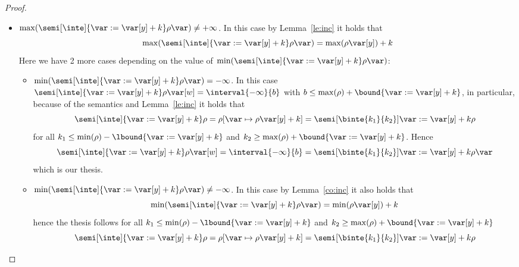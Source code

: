 \begin{proof}
\begin{itemize}
\begin{itemize}
    \end{itemize}
  \item
    \({\max(\semi[\inte]{\var := \var[y] + k}\rho\var)} \neq
    +\infty\). In this case by Lemma~\ref{le:inc} it holds that
    \begin{equation*}
      \max(\semi[\inte]{\var:= \var[y] + k}\rho\var) = \max(\rho\var[y]) + k
    \end{equation*}
    Here we have 2 more cases depending on the value of
    \(\min(\semi[\inte]{\var:= \var[y] + k}\rho\var)\):
    \begin{itemize}
    \item
      \({\min(\semi[\inte]{\var:= \var[y] + k}\rho\var)} =
      -\infty\). In this case
      \(\semi[\inte]{\var := \var[y] + k}\rho\var[w] =
      \interval{-\infty}{b}\) with
      \(b \leq \max(\rho) + \bound{\var := \var[y] + k}\), in
      particular, because of the semantics and Lemma~\ref{le:inc} it
      holds that
      \begin{equation*}
        \semi[\inte]{\var := \var[y] + k}\rho = \rho[\var \mapsto \rho\var[y] + k] = \semi[\binte{k_1}{k_2}]{\var := \var[y] + k}\rho
      \end{equation*}
      for all \(k_1 \leq \min(\rho) - \lbound{\var := \var[y] + k}\)
      and \(k_2 \geq \max(\rho) + \bound{\var := \var[y] + k}\). Hence
      \begin{equation*}
        \semi[\inte]{\var := \var[y] + k}\rho\var[w] = \interval{-\infty}{b} = \semi[\binte{k_1}{k_2}]{\var:=\var[y]+k}\rho\var
      \end{equation*}
      which is our thesis.
      
    \item
      \({\min(\semi[\inte]{\var:= \var[y] + k}\rho\var)} \neq
      -\infty\). In this case by Lemma~\ref{co:inc} it also holds that
      \begin{equation*}
        \min(\semi[\inte]{\var := \var[y] + k}\rho\var) = \min(\rho\var[y]) + k
      \end{equation*}
      hence the thesis follows for all
      \(k_1 \leq \min(\rho) - \lbound{\var := \var[y] + k}\) and
      \(k_2 \geq \max(\rho) + \bound{\var := \var[y] + k}\)
      \begin{equation*}
        \semi[\inte]{\var := \var[y] + k}\rho = \rho[\var \mapsto \rho\var[y] + k] = \semi[\binte{k_1}{k_2}]{\var := \var[y] + k}\rho
      \end{equation*}
    \end{itemize}
  \end{itemize}
  

\end{proof}
